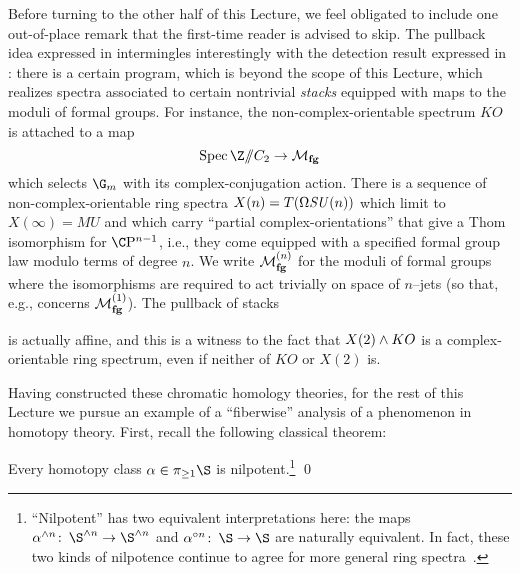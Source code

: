 \begin{remark}\label{RemovingStackinessFromSpectra}
Before turning to the other half of this Lecture, we feel obligated to include one out-of-place remark that the first-time reader is advised to skip.  The pullback idea expressed in  intermingles interestingly with the detection result expressed in : there is a certain program, which is beyond the scope of this Lecture, which realizes spectra associated to certain nontrivial \emph{stacks} equipped with maps to the moduli of formal groups.  For instance, the non-complex-orientable spectrum \(KO\) is attached to a map \[\Spec \Z \mmod C_2 \to \moduli{fg}\] which selects \(\G_m\) with its complex-conjugation action.  There is a sequence of non-complex-orientable ring spectra \(X(n) = T(\Omega \mathit{SU}(n))\) which limit to \(X(\infty) = MU\) and which carry ``partial complex-orientations'' that give a Thom isomorphism for \(\CP^{n-1}\), i.e., they come equipped with a specified formal group law modulo terms of degree \(n\).  We write \(\mathcal{M}_{\mathbf{fg}}^{(n)}\) for the moduli of formal groups where the isomorphisms are required to act trivially on space of \(n\)--jets (so that, e.g.,  concerns \(\mathcal{M}_{\mathbf{fg}}^{(1)}\)).  The pullback of stacks
\begin{center}
\end{center}
is actually affine, and this is a witness to the fact that \(X(2) \wedge KO\) is a complex-orientable ring spectrum, even if neither of \(KO\) or \(X(2)\) is.
\end{remark}

Having constructed these chromatic homology theories, for the rest of this Lecture we pursue an example of a ``fiberwise'' analysis of a phenomenon in homotopy theory.  First, recall the following classical theorem:

\begin{theorem}
Every homotopy class \(\alpha \in \pi_{\ge 1} \S\) is nilpotent.\footnote{``Nilpotent'' has two equivalent interpretations here: the maps \(\alpha^{\sm n}\co \S^{\sm n} \to \S^{\sm n}\) and \(\alpha^{\circ n}\co \S \to \S\) are naturally equivalent.  In fact, these two kinds of nilpotence continue to agree for more general ring spectra~\cite[Introduction]{DHS}.} \qed
\end{theorem}

